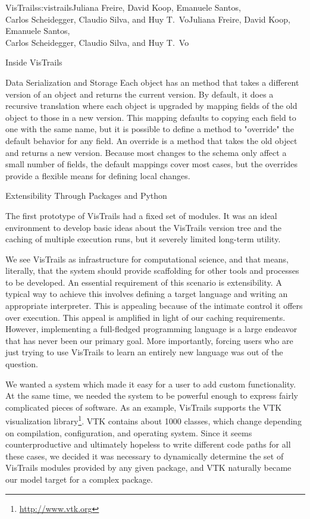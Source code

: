 \begin{aosachaptertoc}{VisTrails}{s:vistrails}{Juliana Freire, David Koop, Emanuele Santos, \\ Carlos Scheidegger, Claudio Silva, and Huy T.\ Vo}{Juliana Freire, David Koop, Emanuele Santos, \\ \hspace*{0.9cm} Carlos Scheidegger, Claudio Silva, and Huy T.\ Vo}
\begin{aosasect1}{Inside VisTrails}
\begin{aosasect2}{Data Serialization and Storage}
Each object has an  method that takes a different
version of an object and returns the current version.  By default, it
does a recursive translation where each object is upgraded by mapping
fields of the old object to those in a new version.  This mapping
defaults to copying each field to one with the same name, but it is
possible to define a method to "override" the default behavior for any
field.  An override is a method that takes the old object and returns
a new version.  Because most changes to the schema only affect a small
number of fields, the default mappings cover most cases, but the
overrides provide a flexible means for defining local changes.

\end{aosasect2}

\begin{aosasect2}{Extensibility Through Packages and Python}
\label{sec.vistrails.packages}

The first prototype of VisTrails had a fixed set of modules. It was an
ideal environment to develop basic ideas about the VisTrails version
tree and the caching of multiple execution runs, but it severely
limited long-term utility.

We see VisTrails as infrastructure for computational science, and that
means, literally, that the system should provide scaffolding for other
tools and processes to be developed. An essential requirement of this
scenario is extensibility.  A typical way to achieve this involves
defining a target language and writing an appropriate
interpreter. This is appealing because of the intimate control it
offers over execution. This appeal is amplified in light of our
caching requirements.  However, implementing a full-fledged
programming language is a large endeavor that has never been our
primary goal. More importantly, forcing users who are just trying to
use VisTrails to learn an entirely new language was out of the
question.

We wanted a system which made it easy for a user to add custom
functionality. At the same time, we needed the system to be powerful
enough to express fairly complicated pieces of software. As an
example, VisTrails supports the VTK visualization library\footnote{\url{http://www.vtk.org}}. VTK
contains about 1000 classes, which change depending on compilation,
configuration, and operating system. Since it seems counterproductive
and ultimately hopeless to write different code paths for all these
cases, we decided it was necessary to dynamically determine the set of
VisTrails modules provided by any given package, and VTK naturally
became our model target for a complex package.


\end{aosasect2}
\end{aosasect1}
\end{aosachaptertoc}
